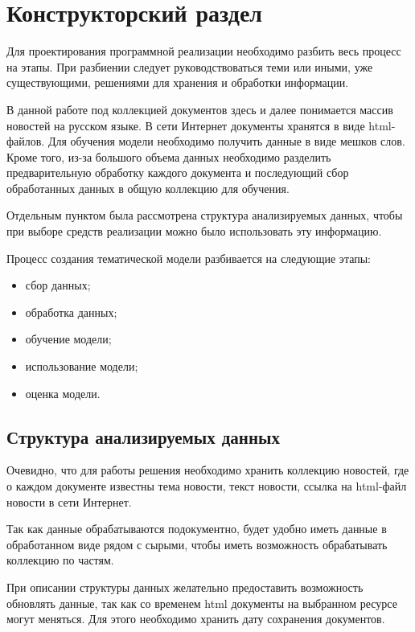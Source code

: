 \chapter{Конструкторский раздел}

Для проектирования программной реализации необходимо разбить весь процесс на этапы. При разбиении следует руководствоваться теми или иными, уже существующими, решениями для хранения и обработки информации.

В данной работе под коллекцией документов здесь и далее понимается массив новостей на русском языке. В сети Интернет документы хранятся в виде html-файлов.
Для обучения модели необходимо получить данные в виде мешков слов.
Кроме того, из-за большого объема данных необходимо разделить предварительную обработку каждого документа и последующий сбор обработанных данных в общую коллекцию для обучения.

Отдельным пунктом была рассмотрена структура анализируемых данных, чтобы при выборе средств реализации можно было использовать эту информацию. 

Процесс создания тематической модели разбивается на следующие этапы:

\begin{itemize}
    \item сбор данных;
    \item обработка данных;
    \item обучение модели;
    \item использование модели;
    \item оценка модели.
\end{itemize}


%
\section{Структура анализируемых данных}

Очевидно, что для работы решения необходимо хранить коллекцию новостей, где о каждом документе известны тема новости, текст новости, ссылка на html-файл новости в сети Интернет.

Так как данные обрабатываются подокументно, будет удобно иметь данные в обработанном виде рядом с сырыми, чтобы иметь возможность обрабатывать коллекцию по частям.

При описании структуры данных желательно предоставить возможность обновлять данные, так как со временем html документы на выбранном ресурсе могут меняться. Для этого необходимо хранить дату сохранения документов.


